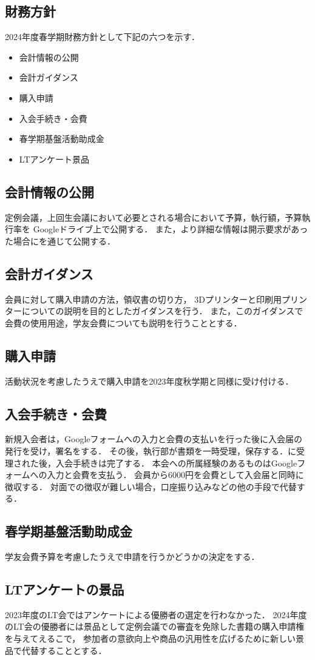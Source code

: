 \subsection*{財務方針}


2024年度春学期財務方針として下記の六つを示す．
\begin{itemize}
    \item 会計情報の公開
    \item 会計ガイダンス
    \item 購入申請
    \item 入会手続き・会費
    \item 春学期基盤活動助成金
    \item LTアンケート景品
\end{itemize}

\subsection*{会計情報の公開}
定例会議，上回生会議において必要とされる場合において予算，執行額，予算執行率を Googleドライブ上で公開する．
また，より詳細な情報は開示要求があった場合に\kaikeiStaff{}を通じて公開する．

\subsection*{会計ガイダンス}
会員に対して購入申請の方法，領収書の切り方， 3Dプリンターと印刷用プリンターについての説明を目的としたガイダンスを行う．
また，このガイダンスで会費の使用用途，学友会費についても説明を行うこととする．

\subsection*{購入申請}
活動状況を考慮したうえで購入申請を2023年度秋学期と同様に受け付ける．

\subsection*{入会手続き・会費}
新規入会者は，Googleフォームへの入力と会費の支払いを行った後に入会届の発行を受け，署名をする．
その後，執行部が書類を一時受理，保存する．\president{}に受理された後，入会手続きは完了する．
本会への所属経験のあるものはGoogleフォームへの入力と会費を支払う．
会員から6000円を会費として入会届と同時に徴収する．
対面での徴収が難しい場合，口座振り込みなどの他の手段で代替する．

\subsection*{春学期基盤活動助成金}
学友会費予算を考慮したうえで申請を行うかどうかの決定をする．

\subsection*{LTアンケートの景品}
2023年度のLT会ではアンケートによる優勝者の選定を行わなかった．
2024年度のLT会の優勝者には景品として定例会議での審査を免除した書籍の購入申請権を与えてえるこで，
参加者の意欲向上や商品の汎用性を広げるために新しい景品で代替することとする．

